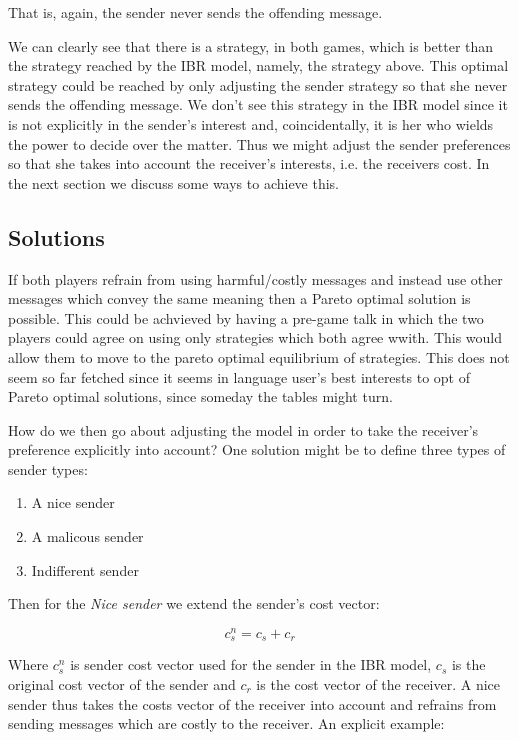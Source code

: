 \documentclass[10]{article}
\begin{document}
That is, again, the sender never sends the offending message.

We can clearly see that there is a strategy, in both games, which is better than the strategy reached by the IBR model, namely, the strategy above. This optimal strategy could be reached by only adjusting the sender strategy so that she never sends the offending message. We don't see this strategy in the IBR model since it is not explicitly in the sender's interest and, coincidentally, it is her who wields the power to decide over the matter. Thus we might adjust the sender preferences so that she takes into account the receiver's interests, i.e. the receivers cost. In the next section we discuss some ways to achieve this.\\

\subsection{Solutions}

If both players refrain from using harmful/costly messages and instead use other messages which convey the same meaning then a Pareto optimal solution is possible. This could be achvieved by having a pre-game talk in which the two players could agree on using only strategies which both agree wwith. This would allow them to move to the pareto optimal equilibrium of strategies. This does not seem so far fetched since it seems in language user's best interests to opt of Pareto optimal solutions, since someday the tables might turn.

How do we then go about adjusting the model in order to take the receiver's preference explicitly into account? One solution might be to define three types of sender types: \\

\begin{enumerate}
\item A nice sender
\item A malicous sender
\item Indifferent sender
\end{enumerate}

Then for the \textit{Nice sender} we extend the sender's cost vector:

\begin{equation*}
c_s^n= c_s + c_r
\end{equation*}

Where $c_s^n$ is sender cost vector used for the sender in the IBR model, $c_s$ is the original cost vector of the sender and $c_r$ is the cost vector of the receiver. A nice sender thus takes the costs vector of the receiver into account and refrains from sending messages which are costly to the receiver. An explicit example:
\end{document}
